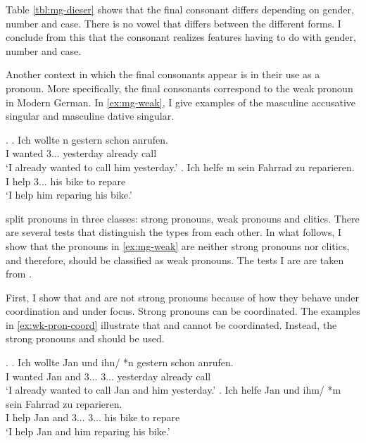 Table \ref{tbl:mg-dieser} shows that the final consonant differs depending on gender, number and case. There is no vowel that differs between the different forms. I conclude from this that the consonant realizes features having to do with gender, number and case.

Another context in which the final consonants appear is in their use as a pronoun. More specifically, the final consonants correspond to the weak pronoun in Modern German. In \ref{ex:mg-weak}, I give examples of the masculine accusative singular and masculine dative singular.

\ex.\label{ex:mg-weak}
\ag. Ich wollte n gestern schon anrufen.\\
 I wanted 3... yesterday already call\\
 `I already wanted to call him yesterday.'
\bg. Ich helfe m sein Fahrrad zu reparieren.\\
 I help 3... his bike to repare\\
 `I help him reparing his bike.'

\citet{cardinaletti1994} split pronouns in three classes: strong pronouns, weak pronouns and clitics. There are several tests that distinguish the types from each other. In what follows, I show that the pronouns in \ref{ex:mg-weak} are neither strong pronouns nor clitics, and therefore, should be classified as weak pronouns. The tests I are are taken from \citet{cardinaletti1994}.

First, I show that  and  are not strong pronouns because of how they behave under coordination and under focus.
Strong pronouns can be coordinated. The examples in \ref{ex:wk-pron-coord} illustrate that  and  cannot be coordinated. Instead, the strong pronouns  and  should be used.

\ex.\label{ex:wk-pron-coord}
\ag. Ich wollte Jan und ihn/ *n gestern schon anrufen.\\
 I wanted Jan and 3... 3... yesterday already call\\
 `I already wanted to call Jan and him yesterday.'
\bg. Ich helfe Jan und ihm/ *m sein Fahrrad zu reparieren.\\
 I help Jan and 3... 3... his bike to repare\\
 `I help Jan and him reparing his bike.'

